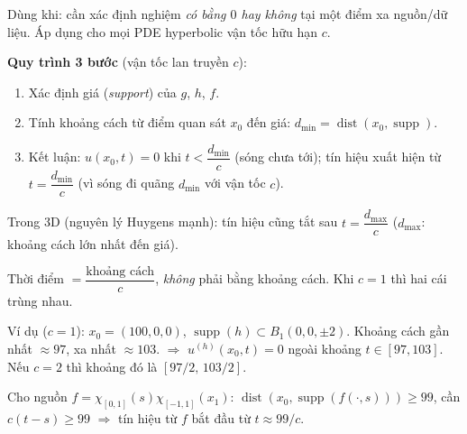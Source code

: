 \begin{dieukienbox}
Dùng khi: cần xác định nghiệm \emph{có bằng $0$ hay không} tại một điểm xa nguồn/dữ liệu.
Áp dụng cho mọi PDE hyperbolic vận tốc hữu hạn $c$.
\end{dieukienbox}

\begin{nhobox}
\textbf{Quy trình 3 bước} (vận tốc lan truyền $c$):
\begin{enumerate}
  \item Xác định giá (\emph{support}) của $g$, $h$, $f$.
  \item Tính khoảng cách từ điểm quan sát $x_0$ đến giá:
        $d_{\min} = \operatorname{dist}(x_0, \operatorname{supp})$.
  \item Kết luận: $u(x_0,t)=0$ khi $t < \dfrac{d_{\min}}{c}$ (sóng chưa tới);
        tín hiệu xuất hiện từ $t = \dfrac{d_{\min}}{c}$ (vì sóng đi quãng $d_{\min}$ với vận tốc $c$).
\end{enumerate}
Trong 3D (nguyên lý Huygens mạnh): tín hiệu cũng tắt sau $t = \dfrac{d_{\max}}{c}$
($d_{\max}$: khoảng cách lớn nhất đến giá).
\end{nhobox}

\begin{luuybox}
Thời điểm $=\dfrac{\text{khoảng cách}}{c}$, \emph{không} phải bằng khoảng cách. Khi $c=1$ thì hai cái trùng nhau.
\end{luuybox}

\begin{meobox}
Ví dụ ($c=1$): $x_0=(100,0,0)$, $\operatorname{supp}(h)\subset B_1(0,0,\pm 2)$.
Khoảng cách gần nhất $\approx 97$, xa nhất $\approx 103$.
$\Rightarrow$ $u^{(h)}(x_0,t)=0$ ngoài khoảng $t\in[97,103]$. Nếu $c=2$ thì khoảng đó là $[97/2,\,103/2]$.

Cho nguồn $f=\chi_{[0,1]}(s)\chi_{[-1,1]}(x_1)$: $\operatorname{dist}(x_0,\operatorname{supp}(f(\cdot,s)))\ge 99$,
cần $c(t-s)\ge 99$ $\Rightarrow$ tín hiệu từ $f$ bắt đầu từ $t\approx 99/c$.
\end{meobox}
